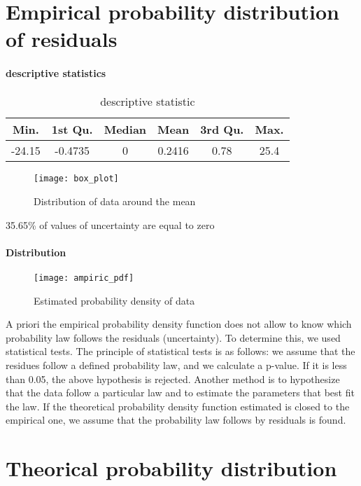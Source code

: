 \section{Empirical probability distribution of residuals}
\paragraph{ descriptive statistics}

\begin{table}[h]
\centering
\caption{descriptive statistic}
\label{my-label}
\begin{tabular}{|c|c|c|c|c|c|}
\hline
\textbf{Min.} & \textbf{1st Qu.} & \textbf{Median} & \textbf{Mean} & \textbf{3rd Qu.} & \textbf{Max.} \\ \hline
-24.15        & -0.4735          & 0               & 0.2416        & 0.78             & 25.4          \\ \hline
\end{tabular}
\end{table}

\begin{figure}[h]
\centering
\texttt{[image: box\_plot]}
\caption{Distribution of data around the mean}
\label{fig:average}
\end{figure}
35.65\% of values of uncertainty are equal  to zero


\paragraph{Distribution}
\begin{figure}[h]
\centering
\texttt{[image: ampiric\_pdf]}
\caption{Estimated probability density of data}
\label{fig:average}
\end{figure}

A priori the empirical probability density function does not allow   to know which probability law follows the residuals (uncertainty). To determine this, we  used statistical tests. The principle of statistical tests is as follows: we assume that the residues follow a defined probability law, and we calculate a p-value. If it is less than 0.05, the above hypothesis is rejected. Another method  is to hypothesize that the data follow a particular law and to estimate the parameters that best fit the law. If the theoretical probability density function estimated is closed to the empirical one, we assume that  the probability law follows by residuals is found.


\section{Theorical probability distribution}

